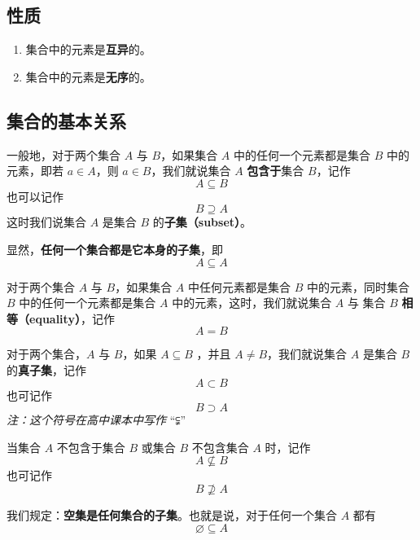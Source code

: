 \subsection{性质}
\begin{enumerate}
\item 集合中的元素是\textbf{互异}的。
\item 集合中的元素是\textbf{无序}的。
\end{enumerate}

\subsection{集合的基本关系}
一般地，对于两个集合 $A$ 与 $B$，如果集合 $A$ 中的任何一个元素都是集合 $B$ 中的元素，即若 $a\in A$，则 $a\in B$，我们就说集合 $A$ \textbf{包含于}集合 $B$，记作
\begin{equation}
A \subseteq B
\end{equation}
也可以记作
\begin{equation}
B \supseteq A
\end{equation}
这时我们说集合 $A$ 是集合 $B$ 的\textbf{子集（subset）}。

显然，\textbf{任何一个集合都是它本身的子集}，即
\begin{equation}
A \subseteq A
\end{equation}

对于两个集合 $A$ 与 $B$，如果集合 $A$ 中任何元素都是集合 $B$ 中的元素，同时集合 $B$ 中的任何一个元素都是集合 $A$ 中的元素，这时，我们就说集合 $A$ 与 集合 $B$ \textbf{相等（equality）}，记作
\begin{equation}
A=B
\end{equation}

对于两个集合，$A$ 与 $B$，如果 $A\subseteq B$ ，并且 $A \ne B$，我们就说集合 $A$ 是集合 $B$ 的\textbf{真子集}，记作
\begin{equation}
A \subset B
\end{equation}
也可记作
\begin{equation}
B \supset A
\end{equation}
\textsl{注：这个符号在高中课本中写作} “⫋”

当集合 $A$ 不包含于集合 $B$ 或集合 $B$ 不包含集合 $A$ 时，记作
\begin{equation}
A \nsubseteq B
\end{equation}
也可记作
\begin{equation}
B \nsupseteq A
\end{equation}

我们规定：\textbf{空集是任何集合的子集}。也就是说，对于任何一个集合 $A$ 都有
\begin{equation}
\varnothing \subseteq A
\end{equation}

